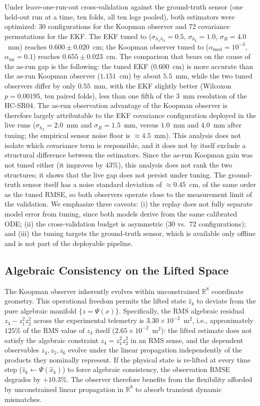 \documentclass[asi,article,accept,pdftex,moreauthors]{Definitions/mdpi}
\begin{document}
{Under leave-one-run-out cross-validation against the ground-truth sensor (one held-out run at a time, ten folds, all ten logs pooled), both estimators were optimized: $30$ configurations for the Koopman observer and $72$ covariance permutations for the EKF. The EKF tuned to ($\sigma_{h_1h_3}=0.5$, $\sigma_{h_2}=1.0$, $\sigma_R=4.0$~mm) reaches $0.600\pm0.020$~cm; the Koopman observer tuned to ($\alpha_\mathrm{med}=10^{-3}$, $\alpha_\mathrm{un}=0.1$) reaches $0.655\pm0.023$~cm. The comparison that bears on the cause of the as-run gap is the following: the tuned EKF ($0.600$~cm) is more accurate than the as-run Koopman observer ($1.151$~cm) by about $5.5$~mm, while the two tuned observers differ by only $0.55$~mm, with the EKF slightly better (Wilcoxon $p=0.00195$, ten paired folds), less than one fifth of the $3$~mm resolution of the HC-SR04. The as-run observation advantage of the Koopman observer is therefore largely attributable to the EKF covariance configuration deployed in the live runs ($\sigma_{h_2}=2.0$~mm and $\sigma_R=1.5$~mm, versus $1.0$~mm and $4.0$~mm after tuning; the empirical sensor noise floor is $\approx 4.5$~mm). This analysis does not isolate which covariance term is responsible, and it does not by itself exclude a structural difference between the estimators. Since the as-run Koopman gain was not tuned either (it improves by $43\%$), this analysis does not rank the two structures; it shows that the live gap does not persist under tuning. The ground-truth sensor itself has a noise standard deviation of $\approx 0.45$~cm, of the same order as the tuned RMSE, so both observers operate close to the measurement limit of the validation. We emphasize three caveats: (i) the replay does not fully separate model error from tuning, since both models derive from the same calibrated ODE; (ii) the cross-validation budget is asymmetric ($30$ vs.\ $72$ configurations); and (iii) the tuning targets the ground-truth sensor, which is available only offline and is not part of the deployable pipeline.}

\subsection{Algebraic Consistency on the Lifted Space}

{The Koopman observer inherently evolves within unconstrained $\mathbb R^8$ coordinate geometry. This operational freedom permits the lifted state $\hat z_k$ to deviate from the pure algebraic manifold $\{z=\Psi(x)\}$. Specifically, the RMS algebraic residual $z_4-z_1^2z_2^2$ across the experimental telemetry is $3.30\times10^{-2}$~m$^2$, i.e., approximately $125\%$ of the RMS value of $z_4$ itself ($2.65\times10^{-2}$~m$^2$): the lifted estimate does not satisfy the algebraic constraint $z_4=z_1^2z_2^2$ in an RMS sense, and the dependent observables $z_4,z_5,z_6$ evolve under the linear propagation independently of the products they nominally represent. If the physical state is re-lifted at every time step ($\hat z_k\leftarrow\Psi(\hat x_k)$) to force algebraic consistency, the observation RMSE degrades by $+10.3\%$. The observer therefore benefits from the flexibility afforded by unconstrained linear propagation in $\mathbb R^8$ to absorb transient dynamic mismatches.}
\end{document}
